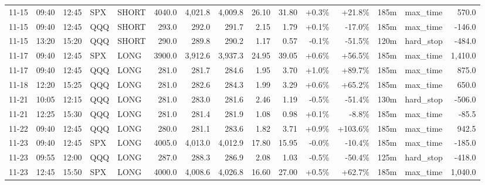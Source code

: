 \documentclass[11pt,a4paper,twoside]{article}
\begin{document}
\begin{landscape}
\begin{center}
\begin{longtable}{>{\color{txtmain}}l l l l l r r r r r r r r >{\color{txtmain}}l r}
11-15 & 09:40 & 12:45 & SPX & SHORT & 4040.0 & 4,021.8 & 4,009.8 & 26.10 & 31.80 & \textcolor{wingreen}{+0.3\%} & \textcolor{wingreen}{+21.8\%} & 185m & max\_time & \textcolor{wingreen}{570.0} \\
11-15 & 09:40 & 12:45 & QQQ & SHORT & 293.0 & 292.0 & 291.7 & 2.15 & 1.79 & \textcolor{wingreen}{+0.1\%} & \textcolor{lossred}{-17.0\%} & 185m & max\_time & \textcolor{lossred}{-146.0} \\
11-15 & 13:20 & 15:20 & QQQ & SHORT & 290.0 & 289.8 & 290.2 & 1.17 & 0.57 & \textcolor{lossred}{-0.1\%} & \textcolor{lossred}{-51.5\%} & 120m & hard\_stop & \textcolor{lossred}{-484.0} \\
11-17 & 09:40 & 12:45 & SPX & LONG & 3900.0 & 3,912.6 & 3,937.3 & 24.95 & 39.05 & \textcolor{wingreen}{+0.6\%} & \textcolor{wingreen}{+56.5\%} & 185m & max\_time & \textcolor{wingreen}{1,410.0} \\
11-17 & 09:40 & 12:45 & QQQ & LONG & 281.0 & 281.7 & 284.6 & 1.95 & 3.70 & \textcolor{wingreen}{+1.0\%} & \textcolor{wingreen}{+89.7\%} & 185m & max\_time & \textcolor{wingreen}{875.0} \\
11-18 & 12:20 & 15:25 & QQQ & LONG & 281.0 & 282.6 & 284.3 & 1.99 & 3.29 & \textcolor{wingreen}{+0.6\%} & \textcolor{wingreen}{+65.2\%} & 185m & max\_time & \textcolor{wingreen}{650.0} \\
11-21 & 10:05 & 12:15 & QQQ & LONG & 281.0 & 283.0 & 281.6 & 2.46 & 1.19 & \textcolor{lossred}{-0.5\%} & \textcolor{lossred}{-51.4\%} & 130m & hard\_stop & \textcolor{lossred}{-506.0} \\
11-21 & 12:25 & 15:30 & QQQ & LONG & 281.0 & 281.4 & 281.9 & 1.08 & 0.98 & \textcolor{wingreen}{+0.1\%} & \textcolor{lossred}{-8.8\%} & 185m & max\_time & \textcolor{lossred}{-85.5} \\
11-22 & 09:40 & 12:45 & QQQ & LONG & 280.0 & 281.1 & 283.6 & 1.82 & 3.71 & \textcolor{wingreen}{+0.9\%} & \textcolor{wingreen}{+103.6\%} & 185m & max\_time & \textcolor{wingreen}{942.5} \\
11-23 & 09:40 & 12:45 & SPX & LONG & 4005.0 & 4,013.0 & 4,012.9 & 17.80 & 15.95 & \textcolor{lossred}{-0.0\%} & \textcolor{lossred}{-10.4\%} & 185m & max\_time & \textcolor{lossred}{-185.0} \\
11-23 & 09:55 & 12:00 & QQQ & LONG & 287.0 & 288.3 & 286.9 & 2.08 & 1.03 & \textcolor{lossred}{-0.5\%} & \textcolor{lossred}{-50.4\%} & 125m & hard\_stop & \textcolor{lossred}{-418.0} \\
11-23 & 12:45 & 15:50 & SPX & LONG & 4000.0 & 4,008.6 & 4,026.8 & 16.60 & 27.00 & \textcolor{wingreen}{+0.5\%} & \textcolor{wingreen}{+62.7\%} & 185m & max\_time & \textcolor{wingreen}{1,040.0} \\

\end{longtable}
\end{center}
\end{landscape}
\end{document}
